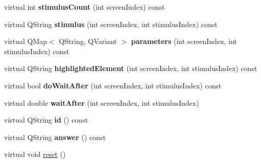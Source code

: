 \begin{DoxyCompactItemize}
\item
\hypertarget{classapex_1_1data_1_1_trial_a0201652985fe3ae6546aa33fdfcb16f5}{virtual int {\bfseries stimulus\-Count} (int screen\-Index) const }\label{classapex_1_1data_1_1_trial_a0201652985fe3ae6546aa33fdfcb16f5}

\item
\hypertarget{classapex_1_1data_1_1_trial_a9207f4baf99bcf3a01458da374dab6b2}{virtual Q\-String {\bfseries stimulus} (int screen\-Index, int stimulus\-Index) const }\label{classapex_1_1data_1_1_trial_a9207f4baf99bcf3a01458da374dab6b2}

\item
\hypertarget{classapex_1_1data_1_1_trial_a786334aa3a9a72fc346abb5aec2cd2b2}{virtual Q\-Map$<$ Q\-String, Q\-Variant $>$ {\bfseries parameters} (int screen\-Index, int stimulus\-Index) const }\label{classapex_1_1data_1_1_trial_a786334aa3a9a72fc346abb5aec2cd2b2}

\item
\hypertarget{classapex_1_1data_1_1_trial_ae963221184e93de148c3dac204cbfecf}{virtual Q\-String {\bfseries highlighted\-Element} (int screen\-Index, int stimulus\-Index) const }\label{classapex_1_1data_1_1_trial_ae963221184e93de148c3dac204cbfecf}

\item
\hypertarget{classapex_1_1data_1_1_trial_a09b63334dabe6db076316e5d0b3f7da4}{virtual bool {\bfseries do\-Wait\-After} (int screen\-Index, int stimulus\-Index) const }\label{classapex_1_1data_1_1_trial_a09b63334dabe6db076316e5d0b3f7da4}

\item
\hypertarget{classapex_1_1data_1_1_trial_a1fc6f009573e7a3405b629d46e5611dc}{virtual double {\bfseries wait\-After} (int screen\-Index, int stimulus\-Index)}\label{classapex_1_1data_1_1_trial_a1fc6f009573e7a3405b629d46e5611dc}

\item
\hypertarget{classapex_1_1data_1_1_trial_af2a930608e568affee6b3e9e9c2657c3}{virtual Q\-String {\bfseries id} () const }\label{classapex_1_1data_1_1_trial_af2a930608e568affee6b3e9e9c2657c3}

\item
\hypertarget{classapex_1_1data_1_1_trial_a0ba532bd70f05484553bf54766f6230d}{virtual Q\-String {\bfseries answer} () const }\label{classapex_1_1data_1_1_trial_a0ba532bd70f05484553bf54766f6230d}

\item
virtual void \hyperlink{classapex_1_1data_1_1_trial_a4615093969f0ed5c8e1fe4ad09d0a465}{reset} ()
\end{DoxyCompactItemize}
